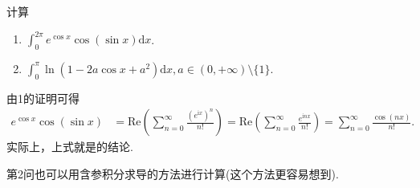 \documentclass[../../main.tex]{subfiles}
\begin{document}
\begin{example}
计算
\begin{enumerate}
\item \(\int_{0}^{2\pi} e^{\cos x} \cos(\sin x) \mathrm{d}x\).

\item \(\int_{0}^{\pi} \ln(1 - 2a\cos x + a^{2}) \mathrm{d}x, a \in (0, +\infty) \setminus \{1\}\). 
\end{enumerate}
\end{example}
\begin{remark}
由1的证明可得
\begin{align*}
e^{\cos x}\cos(\sin x) &= \mathrm{Re}\left( \sum_{n = 0}^{\infty} \frac{(e^{\mathrm{i}x})^n}{n!} \right) = \mathrm{Re}\left( \sum_{n = 0}^{\infty} \frac{e^{\mathrm{i}nx}}{n!} \right) = \sum_{n = 0}^{\infty} \frac{\cos(nx)}{n!}.
\end{align*}
实际上，上式就是的结论. 
\end{remark}
\begin{remark}
第2问也可以用含参积分求导的方法进行计算(这个方法更容易想到).
\end{remark}
\end{document}
